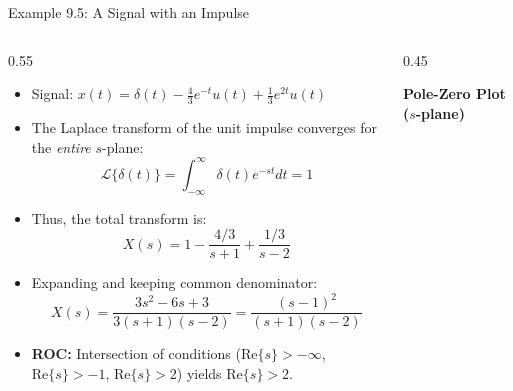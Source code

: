 \begin{frame}{Example 9.5: A Signal with an Impulse}
    \begin{columns}[T]
        \begin{column}{0.55\textwidth}
            \begin{itemize}
                \item Signal: $x(t) = \delta(t) - \frac{4}{3}e^{-t}u(t) + \frac{1}{3}e^{2t}u(t)$
                \item The Laplace transform of the unit impulse converges for the \textit{entire} $s$-plane:
                      \begin{equation*}
                          \mathcal{L}\{\delta(t)\} = \int_{-\infty}^{\infty} \delta(t)e^{-st} dt = 1
                      \end{equation*}
                \item Thus, the total transform is:
                      \begin{equation*}
                          X(s) = 1 - \frac{4/3}{s+1} + \frac{1/3}{s-2}
                      \end{equation*}
                \item Expanding and keeping common denominator:
                      \begin{equation*}
                          X(s) = \frac{3s^2-6s+3}{3(s+1)(s-2)} = \frac{(s-1)^2}{(s+1)(s-2)}
                      \end{equation*}
                \item \textbf{ROC:} Intersection of conditions ($\text{Re}\{s\}>-\infty$, $\text{Re}\{s\}>-1$, $\text{Re}\{s\}>2$) yields $\text{Re}\{s\} > 2$.
            \end{itemize}
        \end{column}
        \begin{column}{0.45\textwidth}
            \begin{center}
                \vspace{0.6cm}
                \textbf{Pole-Zero Plot ($s$-plane)}
                \vspace{0.1cm}

\end{center}
\end{column}
\end{columns}
\end{frame}
